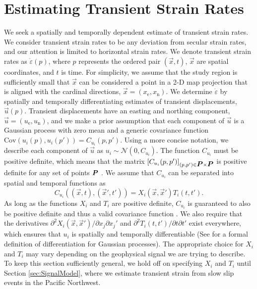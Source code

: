 \documentclass[extra,mreferee]{gji}
\begin{document}
\section{Estimating Transient Strain Rates}\label{sec:Method}
We seek a spatially and temporally dependent estimate of transient strain rates. We consider transient strain rates to be any deviation from secular strain rates, and our attention is limited to horizontal strain rates. We denote transient strain rates as $\dot\varepsilon(p)$, where $p$ represents the ordered pair $(\vec{x},t)$, $\vec{x}$ are spatial coordinates, and $t$ is time. For simplicity, we assume that the study region is sufficiently small that $\vec{x}$ can be considered a point in a 2-D map projection that is aligned with the cardinal directions, $\vec{x} = (x_\mathrm{e},x_\mathrm{n})$. We determine $\dot\varepsilon$ by spatially and temporally differentiating estimates of transient displacements, $\vec{u}(p)$. Transient displacements have an easting and northing component, $\vec{u} = (u_\mathrm{e}, u_\mathrm{n})$, and we make a prior assumption that each component of $\vec{u}$ is a Gaussian process with zero mean and a generic covariance function $\mathrm{Cov}\left(u_i(p),u_i(p')\right) = C_{u_i}(p,p')$. Using a more concise notation, we describe each component of $\vec{u}$ as $u_i \sim \mathcal{N}\left(0,C_{u_i}\right)$. The function $C_{u_i}$ must be positive definite, which means that the matrix $[C_{u_i}(p,p')]_{(p,p') \in \mitbf{P} \times \mitbf{P}}$ is positive definite for any set of points $\mitbf{P}$ \citep[sec. 2.5]{Cressie1992}. We assume that $C_{u_i}$ can be separated into spatial and temporal functions as 
\begin{equation}\label{eq:TransientCovariance}
C_{u_i}\left((\vec{x},t),(\vec{x}',t')\right) = X_i(\vec{x},\vec{x}')T_i(t,t').
\end{equation}  
As long as the functions $X_i$ and $T_i$ are positive definite, $C_{u_i}$ is guaranteed to also be positive definite and thus a valid covariance function \citep[sec. 4.2.4]{Rasmussen2006}. We also require that the derivatives $\partial^2 X_i(\vec{x},\vec{x}')/ \partial x_j \partial x_j'$ and $\partial^2 T_i(t,t') / \partial t \partial t'$ exist everywhere, which ensures that $u_i$ is spatially and temporally differentiable (See \citet[sec. 2.2]{Adler1981} for a formal definition of differentiation for Gaussian processes). The appropriate choice for $X_i$ and $T_i$ may vary depending on the geophysical signal we are trying to describe.  To keep this section sufficiently general, we hold off on specifying $X_i$ and $T_i$ until Section \ref{sec:SignalModel}, where we estimate transient strain from slow slip events in the Pacific Northwest. 
\end{document}
